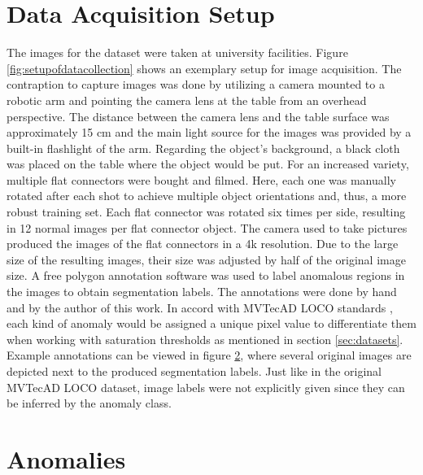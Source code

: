 



\section{Data Acquisition Setup}
\label{sec:faltconnectordataacquisiton}

The images for the dataset were taken at university facilities.  Figure \ref{fig:setupofdatacollection} shows an exemplary setup for image acquisition. The contraption to capture images was 
done by utilizing a camera mounted to a robotic arm and pointing the camera lens at the table from an overhead perspective. The distance between the camera lens and the table surface was approximately 15 cm and the main light source for the images was provided by a built-in flashlight of the arm. Regarding the object's background, a black cloth was placed on the table where the object would be put. For 
an increased variety, multiple flat connectors were bought and filmed. Here, each one was manually rotated after each shot to achieve multiple object orientations and, thus, a more robust training 
set. Each flat connector was rotated six times per side, resulting in 12 normal images per flat connector object. \newline
The camera used to take pictures produced the images of the flat connectors in a 4k resolution. Due to the large size of the resulting 
images, their size was adjusted by half of the original image size.\newline
A free polygon annotation software was used to label anomalous regions in the images to obtain segmentation labels. The annotations were done by hand and by the author of this work. In accord with 
MVTecAD LOCO standards \cite{LOCODentsAndScratchesBergmann2022}, each kind of anomaly would be assigned a unique pixel value to differentiate them when working with saturation thresholds 
as mentioned in section \ref{sec:datasets}. Example annotations can be viewed in figure \ref{sec:flatconnectoranomalies}, where several original images are depicted next to the produced segmentation labels. Just like in the 
original MVTecAD LOCO dataset, image labels were not explicitly given since they can be inferred by the anomaly class.





\section{Anomalies}
\label{sec:flatconnectoranomalies}

